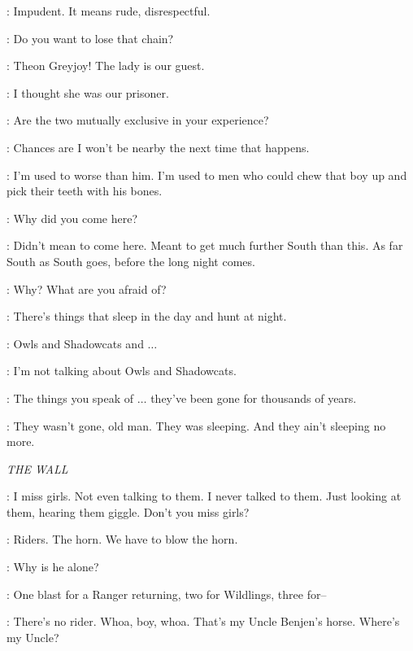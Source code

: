\THEON: Impudent. It means rude, disrespectful. 

\THEON:  Do you want to lose that chain? 


\LUWIN: Theon Greyjoy! The lady is our guest. 

\THEON: I thought she was our prisoner. 

\LUWIN: Are the two mutually exclusive in your experience? 


\LUWIN: Chances are I won't be nearby the next time that happens. 

\OSHA: I'm used to worse than him. I'm used to men who could chew that boy up and pick their teeth with his bones. 

\LUWIN: Why did you come here? 

\OSHA: Didn't mean to come here. Meant to get much further South than this. As far South as South goes, before the long night comes. 

\LUWIN: Why? What are you afraid of? 

\OSHA: There's things that sleep in the day and hunt at night. 

\LUWIN: Owls and Shadowcats and $\ldots$ 

\OSHA: I'm not talking about Owls and Shadowcats. 

\LUWIN: The things you speak of $\ldots$ they've been gone for thousands of years. 

\OSHA: They wasn't gone, old man. They was sleeping. And they ain't sleeping no more. 


\scene

\textit{THE WALL} 


\SAM: I miss girls. Not even talking to them. I never talked to them. Just looking at them, hearing them giggle. Don't you miss girls?

\SAM:  Riders.  The horn. We have to blow the horn. 

\JON: Why is he alone? 

\SAM: One blast for a Ranger returning, two for Wildlings, three for--

\JON: There's no rider.  Whoa, boy, whoa. That's my Uncle Benjen's horse. Where's my Uncle? 


